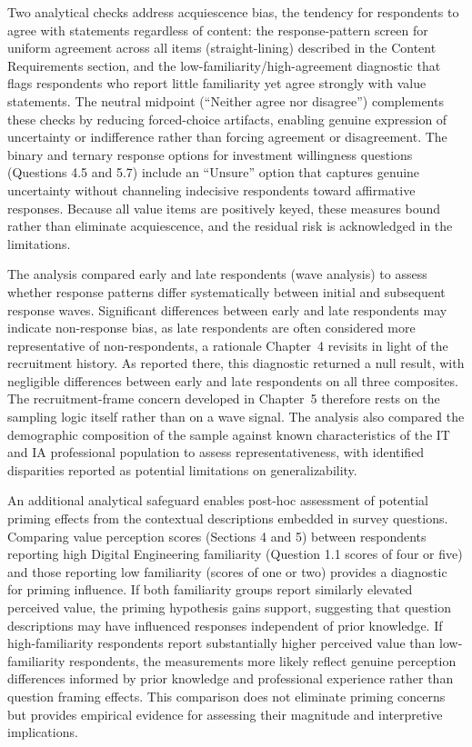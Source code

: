 Two analytical checks address acquiescence bias, the tendency for respondents to agree with statements regardless of content: the response-pattern screen for uniform agreement across all items (straight-lining) described in the Content Requirements section, and the low-familiarity/high-agreement diagnostic that flags respondents who report little familiarity yet agree strongly with value statements. The neutral midpoint (``Neither agree nor disagree'') complements these checks by reducing forced-choice artifacts, enabling genuine expression of uncertainty or indifference rather than forcing agreement or disagreement. The binary and ternary response options for investment willingness questions (Questions 4.5 and 5.7) include an ``Unsure'' option that captures genuine uncertainty without channeling indecisive respondents toward affirmative responses. Because all value items are positively keyed, these measures bound rather than eliminate acquiescence, and the residual risk is acknowledged in the limitations.

The analysis compared early and late respondents (wave analysis) to assess whether response patterns differ systematically between initial and subsequent response waves. Significant differences between early and late respondents may indicate non-response bias, as late respondents are often considered more representative of non-respondents, a rationale Chapter~4 revisits in light of the recruitment history. As reported there, this diagnostic returned a null result, with negligible differences between early and late respondents on all three composites. The recruitment-frame concern developed in Chapter~5 therefore rests on the sampling logic itself rather than on a wave signal. The analysis also compared the demographic composition of the sample against known characteristics of the IT and IA professional population to assess representativeness, with identified disparities reported as potential limitations on generalizability.

An additional analytical safeguard enables post-hoc assessment of potential priming effects from the contextual descriptions embedded in survey questions. Comparing value perception scores (Sections 4 and 5) between respondents reporting high Digital Engineering familiarity (Question 1.1 scores of four or five) and those reporting low familiarity (scores of one or two) provides a diagnostic for priming influence. If both familiarity groups report similarly elevated perceived value, the priming hypothesis gains support, suggesting that question descriptions may have influenced responses independent of prior knowledge. If high-familiarity respondents report substantially higher perceived value than low-familiarity respondents, the measurements more likely reflect genuine perception differences informed by prior knowledge and professional experience rather than question framing effects. This comparison does not eliminate priming concerns but provides empirical evidence for assessing their magnitude and interpretive implications.

